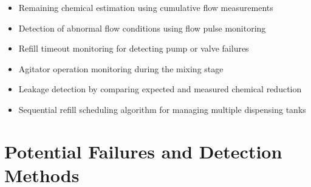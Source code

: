 \documentclass[12pt,a4paper]{report}
\begin{document}
\begin{itemize}

    \item Remaining chemical estimation using cumulative flow measurements

    \item Detection of abnormal flow conditions using flow pulse monitoring

    \item Refill timeout monitoring for detecting pump or valve failures

    \item Agitator operation monitoring during the mixing stage

    \item Leakage detection by comparing expected and measured chemical reduction

    \item Sequential refill scheduling algorithm for managing multiple dispensing tanks

\end{itemize}

\section{Potential Failures and Detection Methods}
\end{document}
